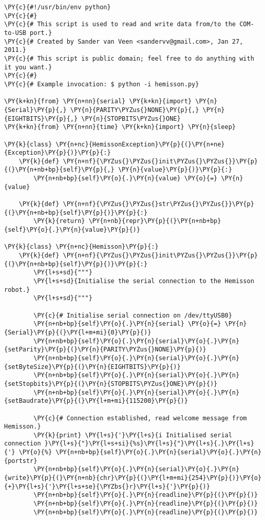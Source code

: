 \begin{Verbatim}[commandchars=\\\{\}]
\PY{c}{#!/usr/bin/env python}
\PY{c}{#}
\PY{c}{# This script is used to read and write data from/to the COM-to-USB port.}
\PY{c}{# Created by Sander van Veen <sandervv@gmail.com>, Jan 27, 2011.}
\PY{c}{# This script is public domain; feel free to do anything with it you want.}
\PY{c}{#}
\PY{c}{# Example invocation: $ python -i hemisson.py}

\PY{k+kn}{from} \PY{n+nn}{serial} \PY{k+kn}{import} \PY{n}{Serial}\PY{p}{,} \PY{n}{PARITY\PYZus{}NONE}\PY{p}{,} \PY{n}{EIGHTBITS}\PY{p}{,} \PY{n}{STOPBITS\PYZus{}ONE}
\PY{k+kn}{from} \PY{n+nn}{time} \PY{k+kn}{import} \PY{n}{sleep}

\PY{k}{class} \PY{n+nc}{HemissonException}\PY{p}{(}\PY{n+ne}{Exception}\PY{p}{)}\PY{p}{:}
    \PY{k}{def} \PY{n+nf}{\PYZus{}\PYZus{}init\PYZus{}\PYZus{}}\PY{p}{(}\PY{n+nb+bp}{self}\PY{p}{,} \PY{n}{value}\PY{p}{)}\PY{p}{:}
        \PY{n+nb+bp}{self}\PY{o}{.}\PY{n}{value} \PY{o}{=} \PY{n}{value}

    \PY{k}{def} \PY{n+nf}{\PYZus{}\PYZus{}str\PYZus{}\PYZus{}}\PY{p}{(}\PY{n+nb+bp}{self}\PY{p}{)}\PY{p}{:}
        \PY{k}{return} \PY{n+nb}{repr}\PY{p}{(}\PY{n+nb+bp}{self}\PY{o}{.}\PY{n}{value}\PY{p}{)}

\PY{k}{class} \PY{n+nc}{Hemisson}\PY{p}{:}
    \PY{k}{def} \PY{n+nf}{\PYZus{}\PYZus{}init\PYZus{}\PYZus{}}\PY{p}{(}\PY{n+nb+bp}{self}\PY{p}{)}\PY{p}{:}
        \PY{l+s+sd}{"""}
        \PY{l+s+sd}{Initialise the serial connection to the Hemisson robot.}
        \PY{l+s+sd}{"""}

        \PY{c}{# Initialise serial connection on /dev/ttyUSB0}
        \PY{n+nb+bp}{self}\PY{o}{.}\PY{n}{serial} \PY{o}{=} \PY{n}{Serial}\PY{p}{(}\PY{l+m+mi}{0}\PY{p}{)}
        \PY{n+nb+bp}{self}\PY{o}{.}\PY{n}{serial}\PY{o}{.}\PY{n}{setParity}\PY{p}{(}\PY{n}{PARITY\PYZus{}NONE}\PY{p}{)}
        \PY{n+nb+bp}{self}\PY{o}{.}\PY{n}{serial}\PY{o}{.}\PY{n}{setByteSize}\PY{p}{(}\PY{n}{EIGHTBITS}\PY{p}{)}
        \PY{n+nb+bp}{self}\PY{o}{.}\PY{n}{serial}\PY{o}{.}\PY{n}{setStopbits}\PY{p}{(}\PY{n}{STOPBITS\PYZus{}ONE}\PY{p}{)}
        \PY{n+nb+bp}{self}\PY{o}{.}\PY{n}{serial}\PY{o}{.}\PY{n}{setBaudrate}\PY{p}{(}\PY{l+m+mi}{115200}\PY{p}{)}

        \PY{c}{# Connection established, read welcome message from Hemisson.}
        \PY{k}{print} \PY{l+s}{'}\PY{l+s}{i Initialised serial connection }\PY{l+s}{"}\PY{l+s+si}{%s}\PY{l+s}{"}\PY{l+s}{.}\PY{l+s}{'} \PY{o}{%} \PY{n+nb+bp}{self}\PY{o}{.}\PY{n}{serial}\PY{o}{.}\PY{n}{portstr}
        \PY{n+nb+bp}{self}\PY{o}{.}\PY{n}{serial}\PY{o}{.}\PY{n}{write}\PY{p}{(}\PY{n+nb}{chr}\PY{p}{(}\PY{l+m+mi}{254}\PY{p}{)}\PY{o}{+}\PY{l+s}{'}\PY{l+s+se}{\PYZbs{}r}\PY{l+s}{'}\PY{p}{)}
        \PY{n+nb+bp}{self}\PY{o}{.}\PY{n}{readline}\PY{p}{(}\PY{p}{)}
        \PY{n+nb+bp}{self}\PY{o}{.}\PY{n}{readline}\PY{p}{(}\PY{p}{)}
        \PY{n+nb+bp}{self}\PY{o}{.}\PY{n}{readline}\PY{p}{(}\PY{p}{)}


\end{Verbatim}
